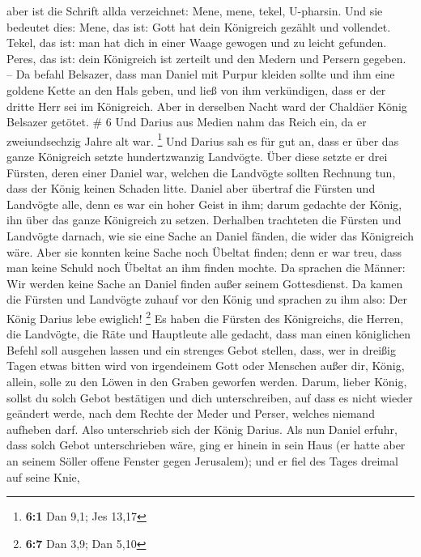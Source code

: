 aber ist die Schrift allda verzeichnet: Mene, mene, tekel, U-pharsin.
 Und sie bedeutet dies: Mene, das ist: Gott hat dein
Königreich gezählt und vollendet.  Tekel, das ist: man
hat dich in einer Waage gewogen und zu leicht gefunden. 
Peres, das ist: dein Königreich ist zerteilt und den Medern und Persern
gegeben. --  Da befahl Belsazer, dass man Daniel mit
Purpur kleiden sollte und ihm eine goldene Kette an den Hals geben, und
ließ von ihm verkündigen, dass er der dritte Herr sei im Königreich.
 Aber in derselben Nacht ward der Chaldäer König Belsazer
getötet. \# 6  Und Darius aus Medien nahm das Reich ein,
da er zweiundsechzig Jahre alt war. \footnote{\textbf{6:1} Dan 9,1; Jes
  13,17}  Und Darius sah es für gut an, dass er über das
ganze Königreich setzte hundertzwanzig Landvögte.  Über
diese setzte er drei Fürsten, deren einer Daniel war, welchen die
Landvögte sollten Rechnung tun, dass der König keinen Schaden litte.
 Daniel aber übertraf die Fürsten und Landvögte alle, denn
es war ein hoher Geist in ihm; darum gedachte der König, ihn über das
ganze Königreich zu setzen.  Derhalben trachteten die
Fürsten und Landvögte darnach, wie sie eine Sache an Daniel fänden, die
wider das Königreich wäre. Aber sie konnten keine Sache noch Übeltat
finden; denn er war treu, dass man keine Schuld noch Übeltat an ihm
finden mochte.  Da sprachen die Männer: Wir werden keine
Sache an Daniel finden außer seinem Gottesdienst.  Da
kamen die Fürsten und Landvögte zuhauf vor den König und sprachen zu ihm
also: Der König Darius lebe ewiglich! \footnote{\textbf{6:7} Dan 3,9;
  Dan 5,10}  Es haben die Fürsten des Königreichs, die
Herren, die Landvögte, die Räte und Hauptleute alle gedacht, dass man
einen königlichen Befehl soll ausgehen lassen und ein strenges Gebot
stellen, dass, wer in dreißig Tagen etwas bitten wird von irgendeinem
Gott oder Menschen außer dir, König, allein, solle zu den Löwen in den
Graben geworfen werden.  Darum, lieber König, sollst du
solch Gebot bestätigen und dich unterschreiben, auf dass es nicht wieder
geändert werde, nach dem Rechte der Meder und Perser, welches niemand
aufheben darf.  Also unterschrieb sich der König Darius.
 Als nun Daniel erfuhr, dass solch Gebot unterschrieben
wäre, ging er hinein in sein Haus (er hatte aber an seinem Söller offene
Fenster gegen Jerusalem); und er fiel des Tages dreimal auf seine Knie,
